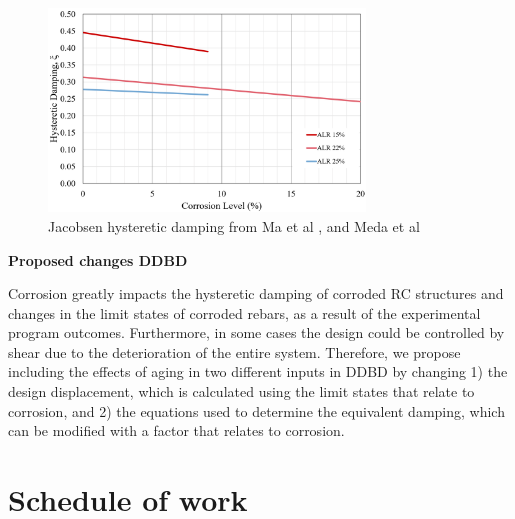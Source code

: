 \begin{figure}[htbp]
	\centering
    \includegraphics[width=0.75\textwidth]{VAC Prelim 2.0/Chapter-5/figs/HystereticDampingLitResults.png}
	\caption{Jacobsen hysteretic damping from Ma et al \cite{Ma2012}, and Meda et al \cite{Meda2014}}
	\label{fig:JacobsenResults}
\end{figure}

\textbf{Proposed changes DDBD}

Corrosion greatly impacts the hysteretic damping of corroded RC structures and changes in the limit states of corroded rebars, as a result of the experimental program outcomes. Furthermore, in some cases the design could be controlled by shear due to the deterioration of the entire system. Therefore, we propose including the effects of aging in two different inputs in DDBD by changing 1) the design displacement, which is calculated using the limit states that relate to corrosion, and 2) the equations used to determine the equivalent damping, which can be modified with a factor that relates to corrosion.
\newpage
\section{Schedule of work}

